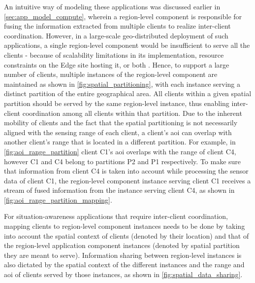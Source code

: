 An intuitive way of modeling these applications was discussed earlier in \cref{sec:app_model_compute}, wherein a region-level component is responsible for fusing the information extracted from multiple clients to realize inter-client coordination. However, in a large-scale geo-distributed deployment of such applications, a single region-level component would be insufficient to serve all the clients - because of scalability limitations in its implementation, resource constraints on the Edge site hosting it, or both \cite{talkycars}. Hence, to support a large number of clients, multiple instances of the region-level component are maintained as shown in \cref{fig:spatial_partitioning}, with each instance serving a distinct partition of the entire geographical area. All clients within a given spatial partition should be served by the same region-level instance, thus enabling inter-client coordination among all clients within that partition. Due to the inherent mobility of clients and the fact that the spatial partitioning is not necessarily aligned with the sensing range of each client, a client's \gls{aoi} can overlap with another client's range that is located in a different partition. For example, in \cref{fig:aoi_range_partition} client C1's \gls{aoi} overlaps with the range of client C4, however C1 and C4 belong to partitions P2 and P1 respectively. To make sure that information from client C4 is taken into account while processing the sensor data of client C1, the region-level component instance serving client C1 receives a stream of fused information from the instance serving client C4, as shown in \cref{fig:aoi_range_partition_mapping}. 

\par For situation-awareness applications that require inter-client coordination, mapping clients to region-level component instances needs to be done by taking into account the spatial context of clients (denoted by their location) and that of the region-level application component instances (denoted by spatial partition they are meant to serve). Information sharing between region-level instances is also dictated by the spatial context of the different instances and the range and \gls{aoi} of clients served by those instances, as shown in \cref{fig:spatial_data_sharing}. 

